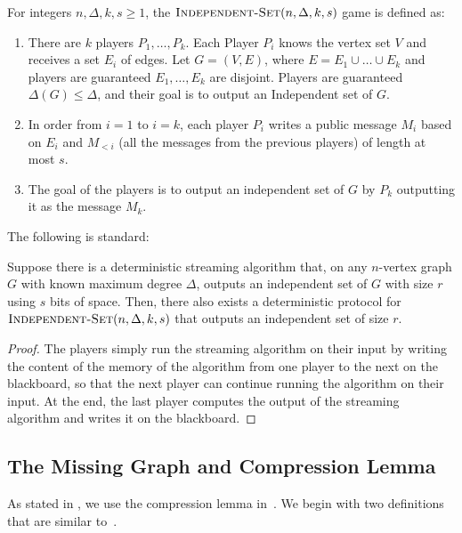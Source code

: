 \documentclass[11pt]{article}
\begin{document}
\newcommand{\IndepSet}{\textnormal{\textsc{Independent-Set}}}

\begin{mdframed}
    For integers $n, \Delta, k, s\ge 1$, the $\IndepSet(n, \Delta, k, s)$ game is defined as:
    \begin{enumerate}
        \item There are $k$ players $P_1, \dots, P_k$. Each Player $P_i$ knows the vertex set $V$ and receives a set $E_i$ of edges. Let $G=(V, E)$, where $E=E_1\cup \dots\cup E_k$ and players are guaranteed $E_1,\dots, E_k$ are disjoint. Players are guaranteed $\Delta(G)\le \Delta$, and their goal is to output an Independent set of $G$.
        \item In order from $i=1$ to $i=k$, each player $P_i$ writes a public message $M_i$ based on $E_i$ and $M_{<i}$ (all the messages from the previous players) of length at most $s$. 
        \item The goal of the players is to output an independent set of $G$ by $P_k$ outputting it as the message $M_k$. 
    \end{enumerate}
\end{mdframed}

The following is standard:

\begin{lemma}\label{algo-to-players}
    Suppose there is a deterministic streaming algorithm that, on any $n$-vertex graph $G$ with known maximum degree $\Delta$, outputs an independent set of $G$ with size $r$ using $s$ bits of space. Then, there also exists a deterministic protocol for $\IndepSet(n,\Delta, k, s)$ that outputs an independent set of size $r$.
\end{lemma}
\begin{proof}
The players simply run the streaming algorithm on their input by writing the content of the memory of the algorithm from one player to the next on the blackboard, so that the next player can continue running the algorithm on their input. At the end, the last player computes the output of the streaming algorithm and writes it on the blackboard.
\end{proof}

\subsection{The Missing Graph and Compression Lemma}

As stated in , we use the compression lemma in~\cite{assadi2022deterministic}. We begin with two definitions that are similar to~\cite{assadi2022deterministic}.
\end{document}
